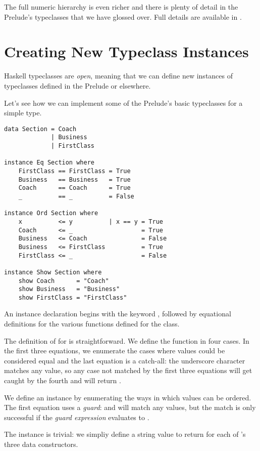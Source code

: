 The full numeric hierarchy is even richer and there is plenty of detail in the Prelude's typeclasses that we
have glossed over. Full details are available in \cite[section 6.4]{haskell98}.

\section{Creating New Typeclass Instances}

Haskell typeclasses are \textit{open}, meaning that we can define new instances of typeclasses defined in the
Prelude or elsewhere.

Let's see how we can implement some of the Prelude's basic typeclasses for a simple type.

\begin{lstlisting}
data Section = Coach
             | Business
             | FirstClass

instance Eq Section where
    FirstClass == FirstClass = True
    Business   == Business   = True
    Coach      == Coach      = True
    _          == _          = False

instance Ord Section where
    x          <= y          | x == y = True
    Coach      <= _                   = True
    Business   <= Coach               = False
    Business   <= FirstClass          = True
    FirstClass <= _                   = False
    
instance Show Section where
    show Coach      = "Coach"
    show Business   = "Business"
    show FirstClass = "FirstClass"
\end{lstlisting}

\begin{notelist}
    \item An instance declaration begins with the keyword , followed by equational
          definitions for the various functions defined for the class.
    \item The definition of \code{(==)} for  is straightforward. We define the function
          in four cases. In the first three equations, we enumerate the cases where values could
          be considered equal and the last equation is a catch-all: the underscore character 
          matches any value, so any case not matched by the first three equations will get caught
          by the fourth and will return .
    \item We define an  instance by enumerating the ways in which  values
          can be ordered. The first equation uses a \textit{guard}:  and  will match
          any values, but the match is only successful if the \textit{guard expression} evaluates
          to .
    \item The  instance is trivial: we simpliy define a string value to return for each
          of 's three data constructors.
\end{notelist}

